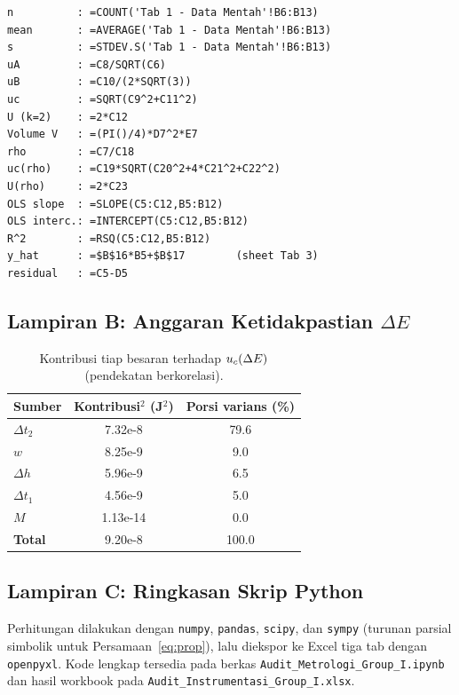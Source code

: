 \documentclass[a4paper, 12pt]{article}
\begin{document}
\begin{lstlisting}
n          : =COUNT('Tab 1 - Data Mentah'!B6:B13)
mean       : =AVERAGE('Tab 1 - Data Mentah'!B6:B13)
s          : =STDEV.S('Tab 1 - Data Mentah'!B6:B13)
uA         : =C8/SQRT(C6)
uB         : =C10/(2*SQRT(3))
uc         : =SQRT(C9^2+C11^2)
U (k=2)    : =2*C12
Volume V   : =(PI()/4)*D7^2*E7
rho        : =C7/C18
uc(rho)    : =C19*SQRT(C20^2+4*C21^2+C22^2)
U(rho)     : =2*C23
OLS slope  : =SLOPE(C5:C12,B5:B12)
OLS interc.: =INTERCEPT(C5:C12,B5:B12)
R^2        : =RSQ(C5:C12,B5:B12)
y_hat      : =$B$16*B5+$B$17        (sheet Tab 3)
residual   : =C5-D5
\end{lstlisting}

    \subsection*{Lampiran B: Anggaran Ketidakpastian $\Delta E$}
    \begin{table}[H]
    \centering
    \singlespacing
    \caption{Kontribusi tiap besaran terhadap $\uc(\Delta E)$ (pendekatan berkorelasi).}
    \label{tab:budgetE}
    \small
    \begin{tabular}{l S[table-format=1.2e-1] S[table-format=3.1]}
    \toprule
    \textbf{Sumber} & {Kontribusi$^2$ (J$^2$)} & {Porsi varians (\%)}\\
    \midrule
    $\Delta t_2$ & 7.32e-8 & 79.6\\
    $w$ & 8.25e-9 & 9.0\\
    $\Delta h$ & 5.96e-9 & 6.5\\
    $\Delta t_1$ & 4.56e-9 & 5.0\\
    $M$ & 1.13e-14 & 0.0\\
    \midrule
    \textbf{Total} & 9.20e-8 & 100.0\\
    \bottomrule
    \end{tabular}
    \end{table}

    \subsection*{Lampiran C: Ringkasan Skrip Python}
    \noindent Perhitungan dilakukan dengan \texttt{numpy}, \texttt{pandas}, \texttt{scipy}, dan \texttt{sympy} (turunan parsial simbolik untuk Persamaan~\eqref{eq:prop}), lalu diekspor ke Excel tiga tab dengan \texttt{openpyxl}. Kode lengkap tersedia pada berkas \texttt{Audit\_Metrologi\_Group\_I.ipynb} dan hasil workbook pada \texttt{Audit\_Instrumentasi\_Group\_I.xlsx}.
\end{document}
